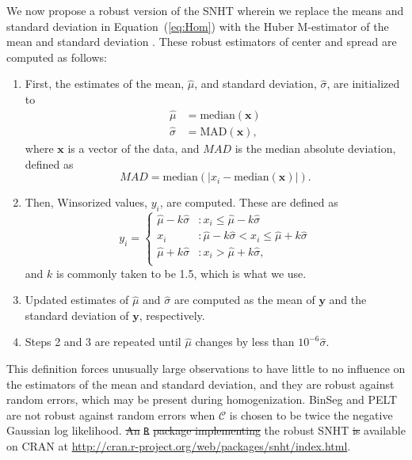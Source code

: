 \documentclass[12pt]{article}
\def\ni{\noindent}
\providecommand{\DIFaddtex}[1]{{\protect\color{blue}\uwave{#1}}} %
\providecommand{\DIFdeltex}[1]{{\protect\color{red}\sout{#1}}}                      %
\providecommand{\DIFaddbegin}{} %
\providecommand{\DIFaddend}{} %
\providecommand{\DIFdelbegin}{} %
\providecommand{\DIFdelend}{} %
\providecommand{\DIFadd}[1]{\texorpdfstring{\DIFaddtex{#1}}{#1}} %
\providecommand{\DIFdel}[1]{\texorpdfstring{\DIFdeltex{#1}}{}} %
\begin{document}
\begin{doublespacing}
We now propose a robust version of the SNHT wherein we replace the means and standard deviation in Equation~(\ref{eq:Hom}) with the Huber M-estimator of the mean and standard deviation \cite{huber11}.  These robust estimators of center and spread are computed as follows:
\begin{enumerate}
	\item First, the estimates of the mean, $\hat{\mu}$, and standard deviation, $\hat{\sigma}$, are initialized to
	\begin{align*}
		\hat{\mu} &= \mbox{median}(\mathbf{x})\\
		\hat{\sigma} &= \mbox{MAD}(\mathbf{x}),
	\end{align*}
	where $\mathbf{x}$ is a vector of the data, and $MAD$ is the median absolute deviation, defined as
	\begin{equation*}
		MAD = \mbox{median}( \lvert x_i - \mbox{median}(\mathbf{x}) \rvert ).
	\end{equation*}
	\item Then, Winsorized values, $y_i$, are computed.  These are defined as
	\begin{equation*}
		y_i = \left\{ \begin{array}{ll}
			\hat{\mu}-k \hat{\sigma} & : x_i \leq \hat{\mu}-k \hat{\sigma}\\
			x_i & : \hat{\mu}-k \hat{\sigma} < x_i \leq \hat{\mu}+k \hat{\sigma}\\
			\hat{\mu}+k \hat{\sigma} & : x_i > \hat{\mu}+k \hat{\sigma},\\
		\end{array} \right.
	\end{equation*}
	and $k$ is commonly taken to be 1.5, which is what we use.
	\item Updated estimates of $\hat{\mu}$ and $\hat{\sigma}$ are computed as the mean of $\mathbf{y}$ and the standard deviation of $\mathbf{y}$, respectively.
	\item Steps 2 and 3 are repeated until $\hat{\mu}$ changes by less than $10^{-6} \hat{\sigma}$.
\end{enumerate}

\ni This definition forces unusually large observations to have little to no influence on the estimators of the mean and standard deviation, and they are robust against random errors, which may be present during homogenization.  BinSeg and PELT are not robust against random errors when $\mathcal{C}$ is chosen to be twice the negative Gaussian log likelihood.  \DIFdelbegin \DIFdel{An }\texttt{\DIFdel{R}} %
\DIFdel{package implementing }\DIFdelend \DIFaddbegin \DIFadd{We implemented }\DIFaddend the robust SNHT \DIFdelbegin \DIFdel{is }\DIFdelend \DIFaddbegin \DIFadd{in an }\texttt{\DIFadd{R}} \DIFadd{package }\DIFaddend available on CRAN at \url{http://cran.r-project.org/web/packages/snht/index.html}.


\end{doublespacing}
\end{document}
